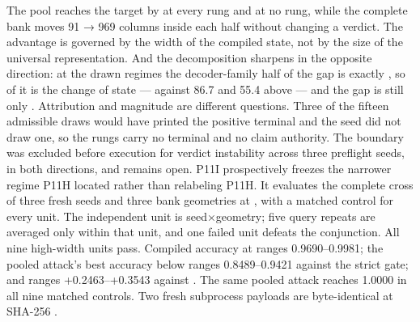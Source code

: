 {}\markdownRendererInterblockSeparator
{}The pool reaches the target by  at every  rung and at no  rung, while the complete bank moves 91 → 969 columns inside each half without changing a verdict. The advantage is governed by the width of the compiled state, not by the size of the universal representation.\markdownRendererInterblockSeparator
{}And the decomposition sharpens in the opposite direction: at the drawn regimes the decoder-family half of the  gap is exactly , so \markdownRendererStrongEmphasis{100\markdownRendererPercentSign{}} of it is the change of state — against 86.7\markdownRendererPercentSign{} and 55.4\markdownRendererPercentSign{} above — and the gap is still only . Attribution and magnitude are different questions.\markdownRendererInterblockSeparator
{}Three of the fifteen admissible draws would have printed the positive terminal and the seed did not draw one, so the  rungs carry no terminal and no claim authority. The  boundary was excluded before execution for verdict instability across three preflight seeds, in both directions, and remains open.\markdownRendererInterblockSeparator
{}
\markdownRendererSectionEnd \markdownRendererSectionBegin
{}\markdownRendererInterblockSeparator
{}P11I prospectively freezes the narrower regime P11H located rather than relabeling P11H. It evaluates the complete cross of three fresh seeds and three bank geometries at , with a matched  control for every unit. The independent unit is seed×geometry; five query repeats are averaged only within that unit, and one failed unit defeats the conjunction.\markdownRendererInterblockSeparator
{}All nine high-width units pass. Compiled accuracy at  ranges 0.9690–0.9981; the pooled attack's best accuracy below  ranges 0.8489–0.9421 against the strict  gate; and  ranges +0.2463–+0.3543 against . The same pooled attack reaches 1.0000 in all nine matched  controls. Two fresh subprocess payloads are byte-identical at SHA-256 .\markdownRendererInterblockSeparator
